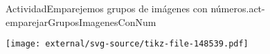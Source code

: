 \documentclass[20pt]{extarticle}
\begin{document}
\begin{activity}{Actividad}{Emparejemos grupos de imágenes con números.}{act-emparejarGruposImagenesConNum}%
\begin{image}{0}{1}{0}{}%
\texttt{[image: external/svg-source/tikz-file-148539.pdf]}
\end{image}%
\end{activity}
\end{document}
